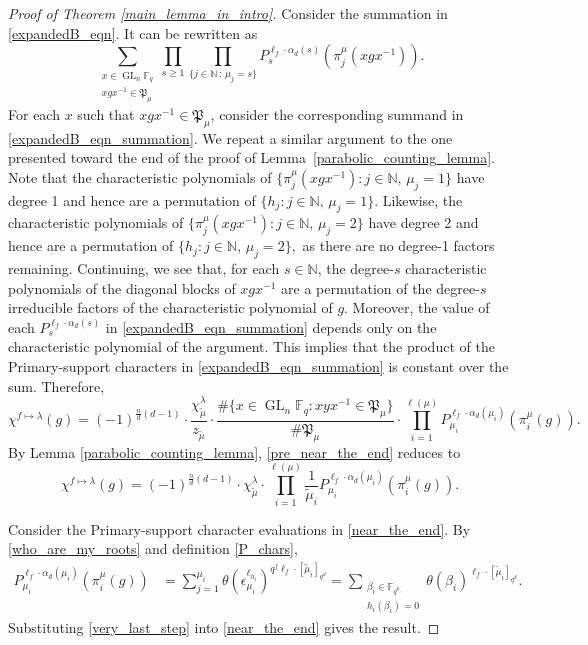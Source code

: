 \documentclass[10pt]{article}
\theoremstyle{definition}
\DeclareMathOperator{\GL}{GL}
\newcommand{\F}{\mathbb{F}}
\newcommand{\N}{\mathbb{N}}
\newcommand{\eps}{\epsilon}
\newcommand{\para}{\mathfrak{P}}
\newcommand{\te}{\theta}
\begin{document}
\begin{proof}[Proof of Theorem \ref{main_lemma_in_intro}]
Consider the summation in \eqref{expandedB_eqn}.
It can be rewritten as
\begin{equation}
\label{expandedB_eqn_summation}
\sum_{\substack{x \in \GL_n \F_q \\ xgx^{-1} \in \para_\mu}}
\prod_{s \geq 1}
\prod_{\{j \in \N \, : \, \mu_j = s\}}
P_s^{\ell_f \cdot \alpha_d(s)}
(\pi_j^\mu (xgx^{-1})).
\end{equation}
For each $x$ such that $xgx^{-1} \in \para_\mu$, consider the corresponding summand in \eqref{expandedB_eqn_summation}.
We repeat a similar argument to the one presented toward the end of the proof of Lemma~\ref{parabolic_counting_lemma}.
Note that the characteristic polynomials of
\(
\{\pi_{j}^\mu (xgx^{-1})
: j \in \N, \, \mu_j = 1\}\)
have degree 1 and hence are a permutation of
\(
\{h_j : j \in \N, \, \mu_j = 1\}.
\)
Likewise, the characteristic polynomials of
\(
\{\pi_{j}^\mu (xgx^{-1}) : j \in \N, \, \mu_j = 2\}\)
have degree 2 and hence are a permutation of
\(
\{h_j : j \in \N, \, \mu_j = 2\},
\)
as there are no degree-1 factors remaining.
Continuing, we see that, for each \(s \in \N\), the degree-\(s\) characteristic polynomials of the diagonal blocks of \(xgx^{-1}\) are a permutation of the degree-\(s\) irreducible factors of the characteristic polynomial of \(g\).
Moreover, the value of each \(P_s^{\ell_f \cdot \alpha_d(s)}\) in \eqref{expandedB_eqn_summation} depends only on the characteristic polynomial of the argument.
This implies that the product of the Primary-support characters in \eqref{expandedB_eqn_summation} is constant over the sum.
Therefore,
\begin{equation}
\label{pre_near_the_end}
\chi^{f \mapsto \lambda} (g) = (-1)^{\tfrac{n}{d} (d-1)} \cdot \frac{\chi^\lambda_{\tilde{\mu}}}{z_{\tilde{\mu}}} \cdot \frac{\# \{x \in \GL_n \F_q : xyx^{-1} \in \para_\mu \} }{\# \para_{\mu}} \cdot \prod_{i = 1}^{\ell(\mu)} P_{\mu_i}^{\ell_f \cdot \alpha_d (\mu_i)} (\pi^\mu_i (g)).
\end{equation}
By Lemma \ref{parabolic_counting_lemma}, \eqref{pre_near_the_end} reduces to
\begin{equation}
\label{near_the_end}
\chi^{f \mapsto \lambda} (g) = (-1)^{\tfrac{n}{d}(d-1)} \cdot
\chi^\lambda_{\tilde{\mu}}
\cdot
\prod_{i = 1}^{\ell(\mu)}
\frac{1}{\tilde{\mu}_i}
P_{\mu_i}^{\ell_f \cdot \alpha_d (\mu_i)} (\pi^\mu_i(g)).
\end{equation}

Consider the Primary-support character evaluations in \eqref{near_the_end}.
By \eqref{who_are_my_roots} and definition \eqref{P_chars},
\begin{align}
P_{\mu_i}^{\ell_f \cdot \alpha_d (\mu_i)} (\pi^\mu_i (g))
& = \sum_{j = 1}^{\mu_i} \te(\eps_{\mu_i}^{\ell_{h_i}})^{q^j \ell_f \cdot [\tilde{\mu}_i]_{q^d}}
= \sum_{\substack{\beta_i \in \F_{q^{\mu_i}} \\ h_i( \beta_i) = 0}} \te ( \beta_i )^{\ell_f \cdot [\tilde{\mu}_i]_{q^d}}. \label{very_last_step}
\end{align}
Substituting \eqref{very_last_step} into \eqref{near_the_end}
gives the result.
\end{proof}
\end{document}
